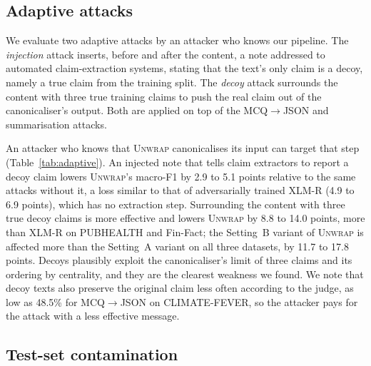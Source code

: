 \documentclass[11pt]{article}
\newcommand{\method}{\textsc{Unwrap}}
\begin{document}
\subsection{Adaptive attacks}

We evaluate two adaptive attacks by an attacker who knows our pipeline. The \emph{injection} attack inserts, before and after the content, a note addressed to automated claim-extraction systems, stating that the text's only claim is a decoy, namely a true claim from the training split. The \emph{decoy} attack surrounds the content with three true training claims to push the real claim out of the canonicaliser's output. Both are applied on top of the MCQ$\rightarrow$JSON and summarisation attacks.

An attacker who knows that \method{} canonicalises its input can target that step (Table~\ref{tab:adaptive}). An injected note that tells claim extractors to report a decoy claim lowers \method{}'s macro-F1 by 2.9 to 5.1 points relative to the same attacks without it, a loss similar to that of adversarially trained XLM-R (4.9 to 6.9 points), which has no extraction step. Surrounding the content with three true decoy claims is more effective and lowers \method{} by 8.8 to 14.0 points, more than XLM-R on PUBHEALTH and Fin-Fact; the Setting~B variant of \method{} is affected more than the Setting~A variant on all three datasets, by 11.7 to 17.8 points. Decoys plausibly exploit the canonicaliser's limit of three claims and its ordering by centrality, and they are the clearest weakness we found. We note that decoy texts also preserve the original claim less often according to the judge, as low as 48.5\% for MCQ$\rightarrow$JSON on CLIMATE-FEVER, so the attacker pays for the attack with a less effective message.

\subsection{Test-set contamination}
\label{sec:contamination}
\end{document}
